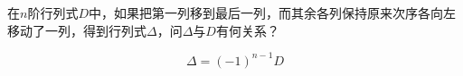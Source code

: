 \begin{frame}
  
    \begin{li}[2013－2014第一学期]
      在$n$阶行列式$D$中，如果把第一列移到最后一列，而其余各列保持原来次序各向左移动了一列，得到行列式$\Delta$，问$\Delta$与$D$有何关系？
    \end{li}
    \pause

    \begin{jie}
    $$
    \Delta=(-1)^{n-1}D
    $$
  \end{jie}
  
\end{frame}


